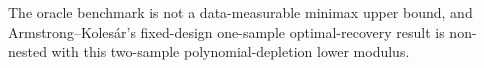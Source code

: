 The oracle benchmark is not a data-measurable minimax upper bound, and Armstrong--Koles\'ar's fixed-design one-sample optimal-recovery result is non-nested with this two-sample polynomial-depletion lower modulus.